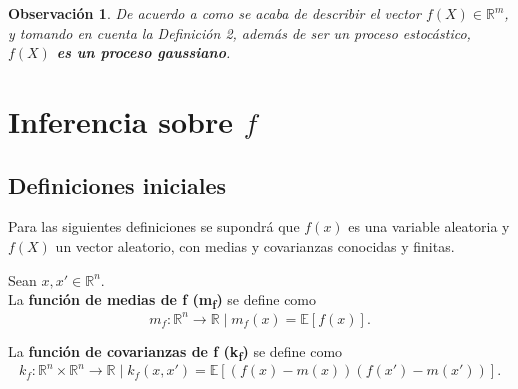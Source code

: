 \newtheorem{obs}{Observaci\'on}

\begin{obs}
    De acuerdo a como se acaba de describir el vector $f(X) \in \mathbb{R}^m$, y tomando en cuenta la Definici\'on 2, además de ser un proceso estoc\'astico, \textbf{$f(X)$ es un proceso gaussiano}.
\end{obs}



\section{Inferencia sobre $f$}

\subsection{Definiciones iniciales}

Para las siguientes definiciones se supondrá que $f(x)$ es una variable aleatoria y $f(X)$ un vector aleatorio, con medias y covarianzas conocidas y finitas.

\begin{defin}
Sean $x,x' \in \mathbb{R}^n$. \\

La \textbf{función de medias de f (m\textsubscript{f})} se define como 
\begin{equation*}
    m_f: \mathbb{R}^n \rightarrow \mathbb{R} 
    \mid
    m_f(x) = \mathbb{E}[f(x)].
\end{equation*}

La \textbf{función de covarianzas de f (k\textsubscript{f})} se define como 
\begin{equation*}
    k_f: \mathbb{R}^n \times \mathbb{R}^n \rightarrow \mathbb{R} 
    \mid
    k_f(x, x') = \mathbb{E}[(f(x) - m(x))(f(x') - m(x'))].
\end{equation*}
\end{defin}

